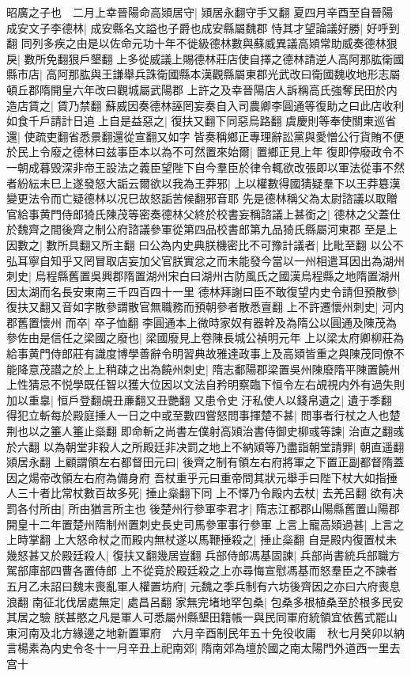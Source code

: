 昭廣之子也　二月上幸晉陽命高熲居守|{
	熲居永翻守手又翻}
夏四月辛酉至自晉陽　成安文子李德林|{
	成安縣名文謚也子爵也成安縣屬魏郡}
恃其才望論議好勝|{
	好呼到翻}
同列多疾之由是以佐命元功十年不徙級德林數與蘇威異議高熲常助威奏德林狠戾|{
	數所免翻狠戶墾翻}
上多從威議上賜德林莊店使自擇之德林請逆人高阿那肱衛國縣市店|{
	高阿那肱與王謙舉兵誅衛國縣本漢觀縣屬東郡光武改曰衛國魏收地形志屬頓丘郡隋開皇六年改曰觀城屬武陽郡}
上許之及幸晉陽店人訴稱高氏強奪民田於内造店賃之|{
	賃乃禁翻}
蘇威因奏德林誣罔妄奏自入司農卿李圓通等復助之曰此店收利如食千戶請計日追上自是益惡之|{
	復扶又翻下同惡烏路翻}
虞慶則等奉使關東巡省還|{
	使疏吏翻省悉景翻還從宣翻又如字}
皆奏稱鄉正專理辭訟黨與愛憎公行貨賄不便於民上令廢之德林曰兹事臣本以為不可然置來始爾|{
	置鄉正見上年}
復即停廢政令不一朝成暮毁深非帝王設法之義臣望陛下自今羣臣於律令輒欲改張即以軍法從事不然者紛紜未巳上遂發怒大詬云爾欲以我為王莽邪|{
	上以權數得國猜疑羣下以王莽簒漢變更法令而亡疑德林以况巳故怒詬苦候翻邪音耶}
先是德林稱父為太尉諮議以取贈官給事黄門侍郎猗氏陳茂等密奏德林父終於校書妄稱諮議上甚銜之|{
	德林之父蓋仕於魏齊之間後齊之制公府諮議參軍從第四品校書郎第九品猗氏縣屬河東郡}
至是上因數之|{
	數所具翻又所主翻}
曰公為内史典朕機密比不可豫計議者|{
	比毗至翻}
以公不弘耳寧自知乎又罔冒取店妄加父官朕實忿之而未能發今當以一州相遣耳因出為湖州刺史|{
	烏程縣舊置吳興郡隋置湖州宋白曰湖州古防風氏之國漢烏程縣之地隋置湖州因太湖而名長安東南三千四百四十一里}
德林拜謝曰臣不敢復望内史令請但預散參|{
	復扶又翻又音如字散參謂散官無職務而預朝參者散悉亶翻}
上不許遷懷州刺史|{
	河内郡舊置懷州}
而卒|{
	卒子恤翻}
李圓通本上微時家奴有器幹及為隋公以圓通及陳茂為參佐由是信任之梁國之廢也|{
	梁國廢見上卷陳長城公禎明元年}
上以梁太府卿柳莊為給事黄門侍郎莊有識度博學善辭令明習典故雅達政事上及高熲皆重之與陳茂同僚不能降意茂譛之於上上稍疎之出為饒州刺史|{
	隋志鄱陽郡梁置吳州陳廢隋平陳置饒州}
上性猜忌不悦學既任智以獲大位因以文法自矜明察臨下恒令左右覘視内外有過失則加以重辠|{
	恒戶登翻覘丑亷翻又丑艷翻}
又患令史汙私使人以錢帛遺之|{
	遺于季翻}
得犯立斬每於殿庭捶人一日之中或至數四嘗怒問事揮楚不甚|{
	問事者行杖之人也楚荆也以之箠人箠止橤翻}
即命斬之尚書左僕射高熲治書侍御史柳彧等諫|{
	治直之翻彧於六翻}
以為朝堂非殺人之所殿廷非决罰之地上不納熲等乃盡詣朝堂請罪|{
	朝直遥翻熲居永翻}
上顧謂領左右都督田元曰|{
	後齊之制有領左右府將軍之下置正副都督隋蓋因之煬帝改領左右府為備身府}
吾杖重乎元曰重帝問其狀元舉手曰陛下杖大如指捶人三十者比常杖數百故多死|{
	捶止橤翻下同}
上不懌乃令殿内去杖|{
	去羌呂翻}
欲有决罰各付所由|{
	所由猶言所主也}
後楚州行參軍李君才|{
	隋志江都郡山陽縣舊置山陽郡開皇十二年置楚州隋制州置刺史長史司馬參軍事行參軍}
上言上寵高熲過甚|{
	上言之上時掌翻}
上大怒命杖之而殿内無杖遂以馬鞭捶殺之|{
	捶止橤翻}
自是殿内復置杖未幾怒甚又於殿廷殺人|{
	復扶又翻幾居豈翻}
兵部侍郎馮基固諫|{
	兵部尚書統兵部職方駕部庫部四曹各置侍郎}
上不從竟於殿廷殺之上亦尋悔宣慰馮基而怒羣臣之不諫者　五月乙未詔曰魏末喪亂軍人權置坊府|{
	元魏之季兵制有六坊後齊因之亦曰六府喪息浪翻}
南征北伐居處無定|{
	處昌呂翻}
家無完堵地罕包桑|{
	包桑多根植桑至於根多民安其居之驗}
朕甚愍之凡是軍人可悉屬州縣墾田籍帳一與民同軍府統領宜依舊式罷山東河南及北方緣邊之地新置軍府　六月辛酉制民年五十免役收庸　秋七月癸卯以納言楊素為内史令冬十一月辛丑上祀南郊|{
	隋南郊為壇於國之南太陽門外道西一里去宫十}


